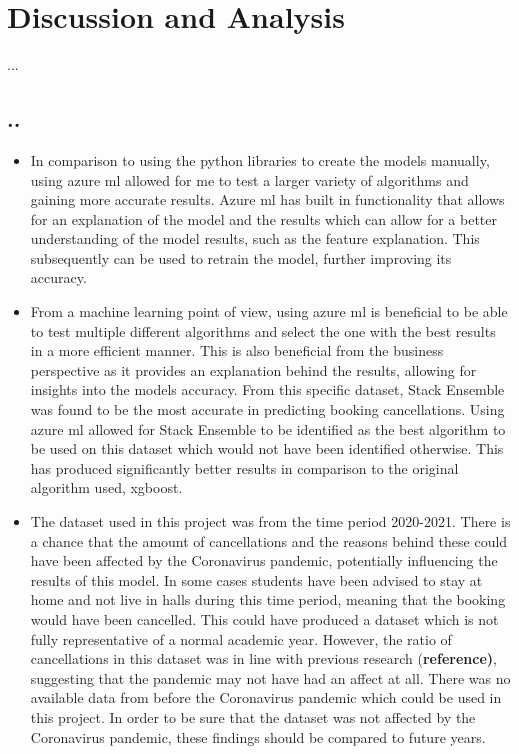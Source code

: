 \chapter{Discussion and Analysis}
...

\section{..}
\begin{itemize}
\item In comparison to using the python libraries to create the models manually, using azure ml allowed for me to test a larger variety of algorithms and gaining more accurate results. Azure ml has built in functionality that allows for an explanation of the model and the results which can allow for a better understanding of the model results, such as the feature explanation. This subsequently can be used to retrain the model, further improving its accuracy. 
\item  From a machine learning point of view, using azure ml is beneficial to be able to test multiple different algorithms and select the one with the best results in a more efficient manner. This is also beneficial from the business perspective as it provides an explanation behind the results, allowing for insights into the models accuracy. From this specific dataset, Stack Ensemble was found to be the most accurate in predicting booking cancellations. Using azure ml allowed for Stack Ensemble to be identified as the best algorithm to be used on this dataset which would not have been identified otherwise. This has produced significantly better results in comparison to the original algorithm used, xgboost. 
\item The dataset used in this project was from the time period 2020-2021. There is a chance that the amount of cancellations and the reasons behind these could have been affected by the Coronavirus pandemic, potentially influencing the results of this model. In some cases students have been advised to stay at home and not live in halls during this time period, meaning that the booking would have been cancelled. This could have produced a dataset which is not fully representative of a normal academic year. However, the ratio of cancellations in this dataset was in line with previous research (\textbf{reference)}, suggesting that the pandemic may not have had an affect at all. There was no available data from before the Coronavirus pandemic which could be used in this project. In order to be sure that the dataset was not affected by the Coronavirus pandemic, these findings should be compared to future years.

\end{itemize}

